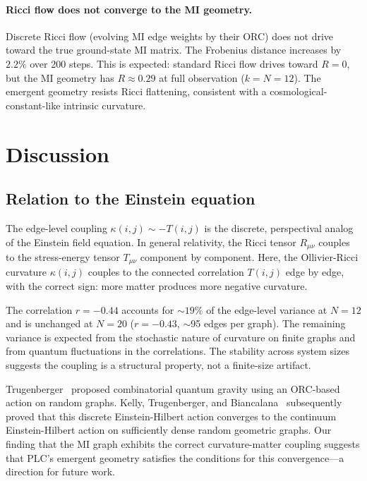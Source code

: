 \documentclass[aps,pra,twocolumn,superscriptaddress,floatfix]{revtex4-2}
\begin{document}
\paragraph{Ricci flow does not converge to the MI geometry.}
Discrete Ricci flow (evolving MI edge weights by their
ORC) does not drive toward the true ground-state MI matrix.
The Frobenius distance increases by $2.2\%$ over 200 steps.
This is expected: standard Ricci flow drives toward
$R = 0$, but the MI geometry has $R \approx 0.29$ at
full observation ($k = N = 12$).
The emergent geometry resists Ricci flattening, consistent
with a cosmological-constant-like intrinsic curvature.


\section{Discussion}
\label{sec:discussion}

\subsection{Relation to the Einstein equation}

The edge-level coupling $\kappa(i,j) \sim -T(i,j)$ is
the discrete, perspectival analog of the Einstein field
equation.  In general relativity, the Ricci tensor
$R_{\mu\nu}$ couples to the stress-energy tensor
$T_{\mu\nu}$ component by component.  Here, the
Ollivier-Ricci curvature $\kappa(i,j)$ couples to the
connected correlation $T(i,j)$ edge by edge, with the
correct sign: more matter produces more negative curvature.

The correlation $r = -0.44$ accounts for $\sim 19\%$ of
the edge-level variance at $N = 12$ and is unchanged
at $N = 20$ ($r = -0.43$, $\sim$95 edges per graph).
The remaining variance is expected from the stochastic
nature of curvature on finite graphs and
from quantum fluctuations in the correlations.
The stability across system sizes suggests
the coupling is a structural property, not a finite-size
artifact.

Trugenberger~\cite{trugenberger2017} proposed combinatorial
quantum gravity using an ORC-based action on random graphs.
Kelly, Trugenberger, and Biancalana~\cite{kelly2022}
subsequently proved that this discrete
Einstein-Hilbert action converges to the
continuum Einstein-Hilbert action on sufficiently dense
random geometric graphs.  Our finding that the MI graph
exhibits the correct curvature-matter coupling suggests
that PLC's emergent geometry satisfies the conditions
for this convergence---a direction for future work.
\end{document}

